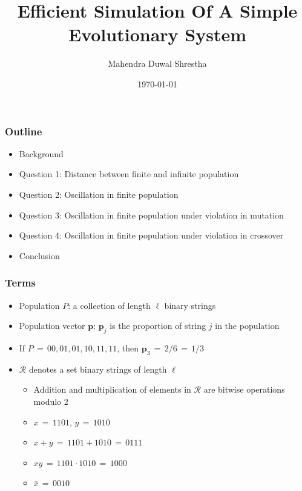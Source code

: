 \documentclass[pdf]{beamer}
\title{Efficient Simulation Of A Simple Evolutionary System}
\author{Mahendra Duwal Shrestha}
\institute{The University Of Tenessee}
\date{\today}
\begin{document}
  \begin{frame}
    \titlepage
  \end{frame}

  \begin{frame}
    \frametitle{Outline}
    \begin{itemize}%
      \item{Background}
      \item{Question 1: Distance between finite and infinite population}
      \item{Question 2: Oscillation in finite population}
      \item{Question 3: Oscillation in finite population under violation in mutation}
      \item{Question 4: Oscillation in finite population under violation in crossover}
      \item{Conclusion}
    \end{itemize}
  \end{frame}

  \begin{frame}
    \frametitle{Terms}
    \begin{itemize}
      \item{Population $P$: a collection of length $\ell$ binary strings}
      \item{Population vector $\bm{p}$: $\bm{p}_j$ is the proportion of string $j$ in the population}
      \item{If $P \,=\, {00, 01, 01, 10, 11, 11}$, then $\bm{p}_3 \,=\, 2/6 \,=\, 1/3$}
      \item{$\mathcal{R}$ denotes a set binary strings of length $\ell$ }
      \begin{itemize}
	\item{Addition and multiplication of elements in $\mathcal{R}$ are bitwise operations modulo 2}
	\item{$x \,=\, 1101,\, y \,=\, 1010 $}
	\item{$x + y \,=\, 1101 + 1010 \,=\, 0111$}
	\item{$xy \,=\, 1101 \cdot 1010 \,=\, 1000$}
	\item{$\bar{x} \,=\, 0010$}
      \end{itemize}
    \end{itemize}
  \end{frame}
  
\end{document}
